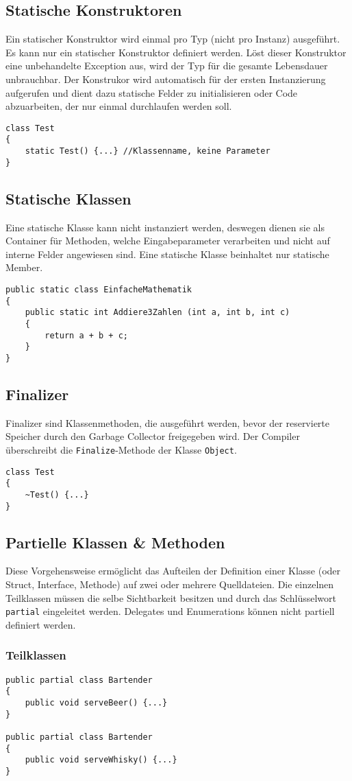 \subsection{Statische Konstruktoren}
Ein statischer Konstruktor wird einmal pro Typ (nicht pro Instanz) ausgeführt. Es kann nur ein statischer Konstruktor definiert werden. Löst dieser Konstruktor eine unbehandelte Exception aus, wird der Typ für die gesamte Lebensdauer unbrauchbar. Der Konstrukor wird automatisch für der ersten Instanzierung aufgerufen und dient dazu statische Felder zu initialisieren oder Code abzuarbeiten, der nur einmal durchlaufen werden soll.
\begin{lstlisting}
class Test
{
	static Test() {...}	//Klassenname, keine Parameter
}
\end{lstlisting}
\subsection{Statische Klassen}
Eine statische Klasse kann nicht instanziert werden, deswegen dienen sie als Container für Methoden, welche Eingabeparameter verarbeiten und nicht auf interne Felder angewiesen sind. Eine statische Klasse beinhaltet nur statische Member.
\begin{lstlisting}
public static class EinfacheMathematik
{
	public static int Addiere3Zahlen (int a, int b, int c)
	{
		return a + b + c;
	}
}
\end{lstlisting}
\subsection{Finalizer}
Finalizer sind Klassenmethoden, die ausgeführt werden, bevor der reservierte Speicher durch den Garbage Collector freigegeben wird. Der Compiler überschreibt die \texttt{Finalize}-Methode der Klasse \texttt{Object}.
\begin{lstlisting}
class Test
{
	~Test() {...}
}
\end{lstlisting}
\subsection{Partielle Klassen \& Methoden}
Diese Vorgehensweise ermöglicht das Aufteilen der Definition einer Klasse (oder Struct, Interface, Methode) auf zwei oder mehrere Quelldateien. Die einzelnen Teilklassen müssen die selbe Sichtbarkeit besitzen und durch das Schlüsselwort \texttt{partial} eingeleitet werden. Delegates und Enumerations können nicht partiell definiert werden.
\subsubsection{Teilklassen}
\begin{lstlisting}
public partial class Bartender
{
	public void serveBeer() {...}
}

public partial class Bartender
{
	public void serveWhisky() {...}
}
\end{lstlisting}
